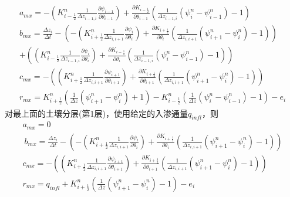 \begin{equation}
\begin{array}{c}{a}_{{mx}}=-\left(K_{i-\frac{1}{2}}^{n} \frac{1}{\Delta z_{i-1, i}}
     \frac{\partial \psi_{i-1}}{\partial \theta_{i-1}}\right)+\frac{\partial K_{i-\frac{1}{2}}}
     {\partial \theta_{i-1}}\left(\frac{1}{\Delta z_{i-1, i}}\left(\psi_{i}^{n}-\psi_{i-1}^{n}\right)-1\right) \\
      {b}_{{mx}}=\frac{\Delta z_{i}}{\Delta t}-\left(-\left(K_{i+\frac{1}{2}}^{n} \frac{1}{\Delta z_{i, i+1}} 
      \frac{\partial \psi_{i}}{\partial \theta_{i}}\right)+\frac{\partial K_{i+\frac{1}{2}}}{\partial \theta_{i}}
      \left(\frac{1}{\Delta z_{i, i+1}}\left(\psi_{i+1}^{n}-\psi_{i}^{n}\right)-1\right)\right) \\
       +\left(\left(K_{i-\frac{1}{2}}^{n} \frac{1}{\Delta z_{i-1, i}} \frac{\partial \psi_{i}}{\partial 
       \theta_{i}}\right)+\frac{\partial K_{i-\frac{1}{2}}}{\partial \theta_{i}}\left(\frac{1}{\Delta z_{i-1, i}}\left(\psi_{i}^{n}
       -\psi_{i-1}^{n}\right)-1\right)\right) \\ {c}_{{mx}}=-\left(\left(K_{i+\frac{1}{2}}^{n} \frac{1}{\Delta z_{i, i+1}} 
       \frac{\partial \psi_{i+1}}{\partial \theta_{i+1}}\right)+\frac{\partial K_{i+\frac{1}{2}}}{\partial \theta_{i+1}}\left(\frac{1}
       {\Delta z_{i, i+1}}\left(\psi_{i+1}^{n}-\psi_{i}^{n}\right)-1\right)\right) \\ r_{m x}=K_{i+\frac{1}{2}}^{n}
       \left(\frac{1}{\Delta z}\left(\psi_{i+1}^{n}-\psi_{i}^{n}\right)+1\right)-K_{i-\frac{1}{2}}^{n}
       \left(\frac{1}{\Delta z}\left(\psi_{i}^{n}-\psi_{i-1}^{n}\right)-1\right)-e_{i}\end{array}
\end{equation}
对最上面的土壤分层(第1层)，使用给定的入渗通量$q_{infl}$，则
\begin{equation}
\begin{array}{c}{a}_{{mx}}=0 \\ {~b}_{{mx}}=\frac{\Delta z_{i}}{\Delta t}-\left(-\left(K_{i+\frac{1}{2}}^{n} 
    \frac{1}{\Delta z_{i, i+1}} \frac{\partial \psi_{i}}{\partial \theta_{i}}\right)+\frac{\partial K_{i+\frac{1}{2}}}{\partial \theta_{i}}\left(\frac{1}{\Delta z_{i, i+1}}
    \left(\psi_{i+1}^{n}-\psi_{i}^{n}\right)-1\right)\right) \\ {c}_{{mx}}=-\left(\left(K_{i+\frac{1}{2}}^{n} \frac{1}{\Delta z_{i, i+1}} 
    \frac{\partial \psi_{i+1}}{\partial \theta_{i+1}}\right)+\frac{\partial K_{i+\frac{1}{2}}}{\partial \theta_{i+1}}\left(\frac{1}{\Delta z_{i, i+1}}
    \left(\psi_{i+1}^{n}-\psi_{i}^{n}\right)-1\right)\right) \\ r_{m x}=q_{i n f l}+K_{i+\frac{1}{2}}^{n}
    \left(\frac{1}{\Delta z}\left(\psi_{i+1}^{n}-\psi_{i}^{n}\right)-1\right)-e_{i}\end{array}
\end{equation}
